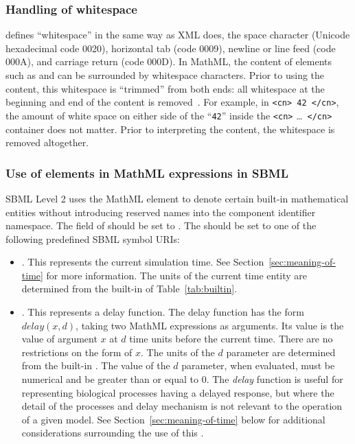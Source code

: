 \subsubsection{Handling of whitespace}
\label{sec:mathml-whitespace}

\mathmltwo defines ``whitespace'' in the same way as XML does, \ie
the space character (Unicode hexadecimal code 0020), horizontal
tab (code 0009), newline or line feed (code 000A), and carriage
return (code 000D).  In MathML, the content of elements such as
 and  can be surrounded by whitespace
characters.  Prior to using the content, this whitespace is
``trimmed'' from both ends: all whitespace at the beginning and
end of the content is removed~\citep{ausbrooks:2003}.  For
example, in \texttt{<cn> 42 </cn>}, the amount of white space on
either side of the ``\texttt{42}'' inside the \texttt{<cn>}
\ldots\ \texttt{</cn>} container does not matter.  Prior to
interpreting the content, the whitespace is removed altogether.


\subsubsection{Use of  elements in MathML expressions in SBML}
\label{sec:csymbol-token}

SBML Level 2 uses the MathML  element to denote
certain built-in mathematical entities without introducing
reserved names into the component identifier namespace.  The
 field of  should be set to
.  The  should be set to one of the
following predefined SBML symbol URIs:
\begin{itemize}

\item {}.  This
  represents the current simulation time.  See
  Section~\ref{sec:meaning-of-time} for more information.  The
  units of the current time entity are determined from the
  built-in  of Table~\vref{tab:builtin}.

\item {}.  This
  represents a delay function.  The delay function has the form
  $delay(x, d)$, taking two MathML expressions as arguments.  Its
  value is the value of argument $x$ at $d$ time units before the
  current time.  There are no restrictions on the form of $x$.
  The units of the $d$ parameter are determined from the built-in
  .  The value of the $d$ parameter, when evaluated,
  must be numerical and be greater than or equal to 0.  The
  \emph{delay} function is useful for representing biological
  processes having a delayed response, but where the detail of the
  processes and delay mechanism is not relevant to the operation
  of a given model.  See Section~\ref{sec:meaning-of-time} below
  for additional considerations surrounding the use of this
  .

\end{itemize}

